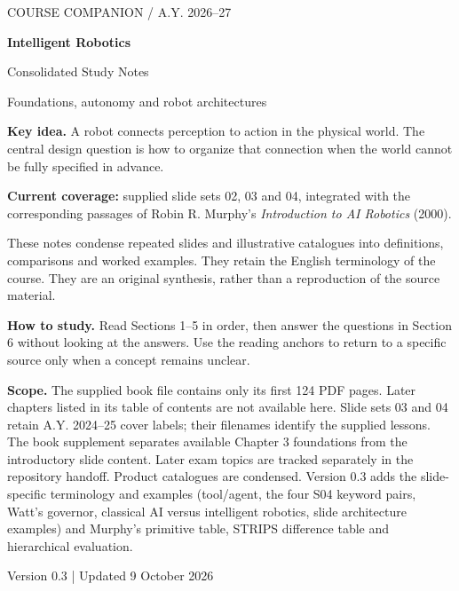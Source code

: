 \documentclass[11pt,a4paper]{article}
\newcommand{\key}[1]{\par\smallskip\noindent\colorbox{pale}{\parbox{\dimexpr\linewidth-2\fboxsep\relax}{\textbf{Key idea.} #1}}\par\smallskip}
\begin{document}
\thispagestyle{empty}
{\small\color{muted}COURSE COMPANION \quad / \quad A.Y. 2026--27\par}
\vspace{12mm}
{\Huge\bfseries\color{ink}Intelligent Robotics\par}
\vspace{4mm}
{\LARGE Consolidated Study Notes\par}
\vspace{7mm}
{\large Foundations, autonomy and robot architectures\par}
\vspace{8mm}
\key{A robot connects perception to action in the physical world. The central design question is how to organize that connection when the world cannot be fully specified in advance.}
\vspace{3mm}
\textbf{Current coverage:} supplied slide sets 02, 03 and 04, integrated with the corresponding passages of Robin R. Murphy's \emph{Introduction to AI Robotics} (2000).

These notes condense repeated slides and illustrative catalogues into definitions, comparisons and worked examples. They retain the English terminology of the course. They are an original synthesis, rather than a reproduction of the source material.

\textbf{How to study.} Read Sections 1--5 in order, then answer the questions in Section 6 without looking at the answers. Use the reading anchors to return to a specific source only when a concept remains unclear.

\textbf{Scope.} The supplied book file contains only its first 124 PDF pages. Later chapters listed in its table of contents are not available here. Slide sets 03 and 04 retain A.Y. 2024--25 cover labels; their filenames identify the supplied lessons. The book supplement separates available Chapter 3 foundations from the introductory slide content. Later exam topics are tracked separately in the repository handoff. Product catalogues are condensed. Version 0.3 adds the slide-specific terminology and examples (tool/agent, the four S04 keyword pairs, Watt's governor, classical AI versus intelligent robotics, slide architecture examples) and Murphy's primitive table, STRIPS difference table and hierarchical evaluation.

\vfill
{\small Version 0.3 \quad | \quad Updated 9 October 2026\par}
\clearpage
{\setlength{\parskip}{0pt}\small\tableofcontents}
\clearpage







\end{document}
